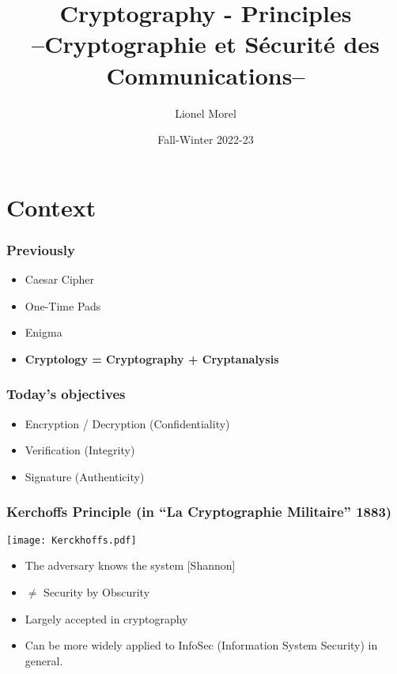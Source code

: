 \documentclass[
hyperref={pdfpagelabels=false}
,xcolor=table
]
{beamer}
\title[CSC - Intro]{Cryptography - Principles \\ --Cryptographie et Sécurité des Communications--}
\author[]{Lionel Morel}
\institute[]{Telecommunications - INSA Lyon}
\date{Fall-Winter 2022-23}
\begin{document}
\begin{frame}
  \maketitle
\end{frame}

\section{Context}

\begin{frame}
  \frametitle{Previously}
  \begin{itemize}
  \item Caesar Cipher
  \item One-Time Pads 
  \item Enigma
  \item \textbf{Cryptology = Cryptography + Cryptanalysis}
  \end{itemize}
\end{frame}


\begin{frame}
  \frametitle{Today's objectives}
  \begin{itemize}
  \item Encryption / Decryption (Confidentiality)
  \item Verification (Integrity)
  \item Signature (Authenticity)
  \end{itemize}
\end{frame}


\begin{frame}
  \frametitle{Kerchoffs Principle {\normalsize (in ``La Cryptographie Militaire'' 1883)}}
  \begin{center}
    \texttt{[image: Kerckhoffs.pdf]}
  \end{center}
  
  \begin{itemize}
  \item The adversary knows the system [Shannon]
  \item $\ne$ Security by Obscurity
  \item Largely accepted in cryptography
  \item Can be more widely applied to InfoSec (Information System Security) in general. 
  \end{itemize}
\end{frame}
\end{document}
